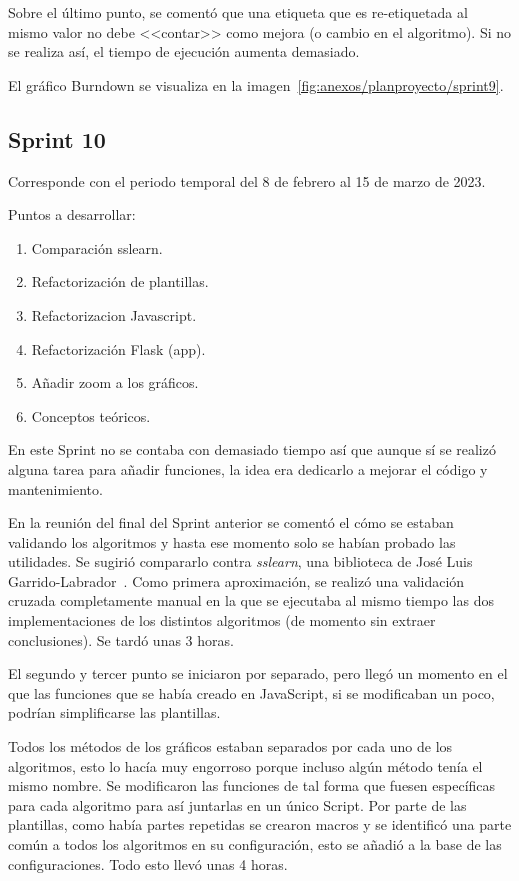 Sobre el último punto, se comentó que una etiqueta que es re-etiquetada al mismo
valor no debe <<contar>> como mejora (o cambio en el algoritmo). Si no se
realiza así, el tiempo de ejecución aumenta demasiado.


El gráfico Burndown se visualiza en la imagen~\ref{fig:anexos/planproyecto/sprint9}.

\subsection{Sprint 10}
Corresponde con el periodo temporal del 8 de febrero al 15 de marzo de 2023.

Puntos a desarrollar:
\begin{enumerate}
    \item Comparación sslearn.
    \item Refactorización de plantillas.
    \item Refactorizacion Javascript.
    \item Refactorización Flask (app).
    \item Añadir zoom a los gráficos.
    \item Conceptos teóricos.
\end{enumerate}

En este Sprint no se contaba con demasiado tiempo así que aunque sí se realizó
alguna tarea para añadir funciones, la idea era dedicarlo a mejorar el código y
mantenimiento.

En la reunión del final del Sprint anterior se comentó el cómo se estaban
validando los algoritmos y hasta ese momento solo se habían probado las
utilidades. Se sugirió compararlo contra \textit{sslearn}, una biblioteca de
José Luis Garrido-Labrador~\cite{jose_luis_garrido_labrador_2023_7781117}. Como
primera aproximación, se realizó una validación cruzada completamente manual en
la que se ejecutaba al mismo tiempo las dos implementaciones de los distintos
algoritmos (de momento sin extraer conclusiones). Se tardó unas 3 horas.

El segundo y tercer punto se iniciaron por separado, pero llegó un momento en el
que las funciones que se había creado en JavaScript, si se modificaban un poco,
podrían simplificarse las plantillas. 

Todos los métodos de los gráficos estaban separados por cada uno de los
algoritmos, esto lo hacía muy engorroso porque incluso algún método tenía el
mismo nombre. Se modificaron las funciones de tal forma que fuesen específicas
para cada algoritmo para así juntarlas en un único Script. Por parte de las
plantillas, como había partes repetidas se crearon macros y se identificó una
parte común a todos los algoritmos en su configuración, esto se añadió a la base
de las configuraciones. Todo esto llevó unas 4 horas.

